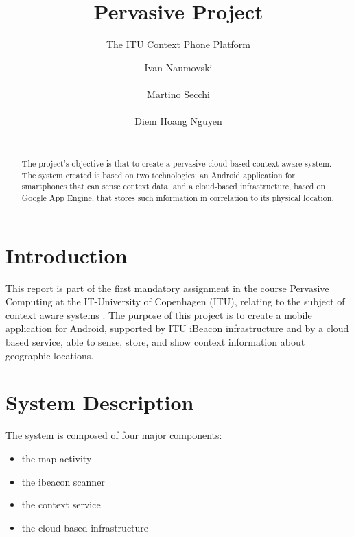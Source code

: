 \documentclass{sigchi}
\begin{document}
\title{Pervasive Project}
\subtitle{The ITU Context Phone Platform}

\author{
  \alignauthor Ivan Naumovski\\
    \\
  \alignauthor Martino Secchi\\
    \\
  \alignauthor Diem Hoang Nguyen\\
    \\
}

\maketitle

\begin{abstract}
The project's objective is that to create a pervasive cloud-based context-aware system. 
The system created is based on two technologies: an Android application for smartphones that can sense context data, and a cloud-based infrastructure, based on Google App Engine, that stores such information in correlation to its physical location.
\end{abstract}



\section{Introduction}
This report is part of the first mandatory assignment in the course Pervasive Computing at the IT-University of Copenhagen (ITU), relating to the subject of context aware systems \cite{Schilit:1994:CACA}.
 The purpose of this project is to create a mobile application for Android, supported by ITU iBeacon infrastructure and by a  cloud based service, able to sense, store, and show context information about geographic locations. 
 
 \section{System Description}

The system is composed of four major components:
\begin{itemize}
\item the map activity
\item the ibeacon scanner
\item the context service
\item the cloud based infrastructure
\end{itemize}
\end{document}
